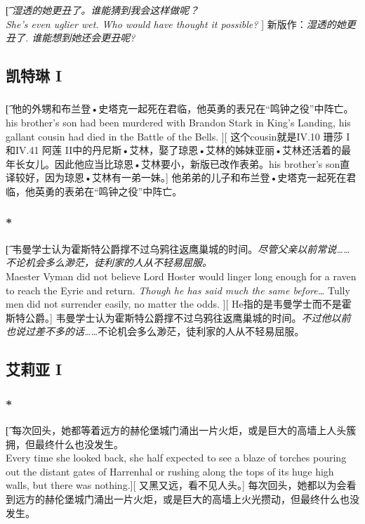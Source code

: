 \documentclass[12pt,a4paper]{article}
\begin{document}
\subsubsection{}\t[
	\emph{湿透的她更丑了。谁能猜到我会这样做呢？\\
	She's even uglier wet. Who would have thought it possible?} ]
	新版作：\emph{湿透的她更丑了. 谁能想到她还会更丑呢?}
	

\subsection{凯特琳 I}
\subsubsection{}\t[
	他的外甥和布兰登•史塔克一起死在君临，他英勇的表兄在“鸣钟之役”中阵亡。\\
	his brother's son had been murdered with Brandon Stark in King's Landing, his gallant cousin had died in the Battle of the Bells. ][
	这个cousin就是IV.10 珊莎 I和IV.41 阿莲 II中的丹尼斯•艾林，娶了琼恩•艾林的姊妹亚丽•艾林还活着的最年长女儿。因此他应当比琼恩•艾林要小，新版已改作表弟。his brother's son直译较好，因为琼恩•艾林有一弟一妹。]
	他弟弟的儿子和布兰登•史塔克一起死在君临，他英勇的表弟在“鸣钟之役”中阵亡。
	
\subsubsection{\color{red}*}\t[
	韦曼学士认为霍斯特公爵撑不过乌鸦往返鹰巢城的时间。\emph{尽管父亲以前常说……不论机会多么渺茫，徒利家的人从不轻易屈服。}\\
	Maester Vyman did not believe Lord Hoster would linger long enough for a raven to reach the Eyrie and return. \emph{Though he has said much the same before\ldots} Tully men did not surrender easily, no matter the odds. ][
	He指的是韦曼学士而不是霍斯特公爵。]
	韦曼学士认为霍斯特公爵撑不过乌鸦往返鹰巢城的时间。\emph{不过他以前也说过差不多的话……}不论机会多么渺茫，徒利家的人从不轻易屈服。
	

\subsection{艾莉亚 I}

\subsubsection{\color{red}*}\t[
	每次回头，她都等着远方的赫伦堡城门涌出一片火炬，或是巨大的高墙上人头簇拥，但最终什么也没发生。\\
	Every time she looked back, she half expected to see a blaze of torches pouring out the distant gates of Harrenhal or rushing along the tops of its huge high walls, but there was nothing.][
	又黑又远，看不见人头。]
	每次回头，她都以为会看到远方的赫伦堡城门涌出一片火炬，或是巨大的高墙上火光攒动，但最终什么也没发生。
	
\end{document}

